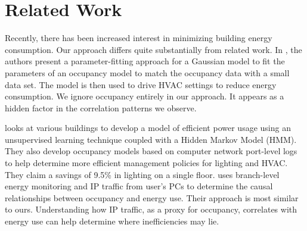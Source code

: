 \section{Related Work}
Recently, there has been increased interest in minimizing building energy consumption.  Our approach
differs quite substantially from related work.
In \cite{occmodels_buildsys11}, the authors present a parameter-fitting 
approach for a Gaussian model to fit the parameters of an occupancy model to match the occupancy data 
with a small data set.  
The model is then used to drive HVAC settings to reduce energy consumption.  We ignore occupancy entirely 
in our approach.  It appears as a hidden factor in the correlation patterns we observe.



\cite{Bellala_buildsys11} looks at various buildings to develop a model of efficient power usage using 
an unsupervised learning technique coupled with a Hidden Markov Model (HMM).  They also develop occupancy models based on
computer network port-level logs to help determine more efficient management policies for lighting and HVAC.  
They claim a savings of 9.5\% in lighting on a single floor. 
\cite{kim:buildsys2010} uses branch-level energy monitoring and IP traffic from user's PCs to determine the
causal relationships between occupancy and energy use.  Their approach is most similar to ours.  Understanding how IP 
traffic, as a proxy for occupancy, correlates with energy use can help determine where inefficiencies may lie.


